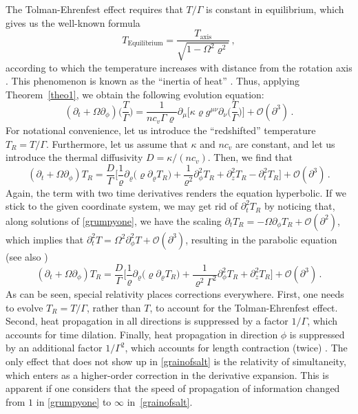\documentclass[a4paper, amsfonts, amssymb, amsmath, reprint, showkeys, nofootinbib, twoside, onecolumn,notitlepage]{revtex4-1}
\theoremstyle{definition}
\theoremstyle{theorem}
\begin{document}
The Tolman-Ehrenfest effect requires that $T/\Gamma$ is constant in equilibrium, which gives us the well-known formula
\begin{equation}\label{Tolmaniamo}
T_{\text{Equilibrium}} =\dfrac{T_{\text{axis}}}{\sqrt{1-\Omega^2\varrho^2}} \, ,
\end{equation}
according to which the temperature increases with distance from the rotation axis \cite[\S 12.5.a]{cercignani_book}.
This phenomenon is known as the ``inertia of heat'' \cite{Israel1981}.
Thus, applying Theorem~\ref{theo1}, we obtain the following evolution equation:
\begin{equation}
(\partial_t{+}\Omega\partial_\phi)\bigg( \dfrac{T}{\Gamma} \bigg)=\dfrac{1}{nc_v\Gamma \varrho} \partial_\mu \bigg[\kappa \varrho g^{\mu \nu}\partial_\nu \bigg(\dfrac{T}{\Gamma} \bigg) \bigg] +\mathcal{O}(\partial^3) \, .
\end{equation}
For notational convenience, let us introduce the ``redshifted'' temperature
$T_R=T/\Gamma$. Furthermore, let us assume that $\kappa$ and $nc_v$ are constant, and let us introduce the thermal diffusivity $D=\kappa/(nc_v)$. Then, we find that
\begin{equation}\label{grumpyone}
(\partial_t{+}\Omega\partial_\phi)T_R=\dfrac{D}{\Gamma } \bigg[ \dfrac{1}{\varrho} \partial_\varrho \big( \varrho \partial_\varrho T_R\big)+\dfrac{1}{\varrho^2}  \partial_\phi^2 T_R+ \partial_z^2 T_R- \partial_t^2 T_R\bigg] +\mathcal{O}(\partial^3)\, .
\end{equation}
Again, the term with two time derivatives renders the equation hyperbolic. If we stick to the given coordinate system, we may get rid of $\partial_t^2 T_R$ by noticing that, along solutions of \eqref{grumpyone}, we have the scaling $\partial_t T_R=-\Omega \partial_\phi T_R +\mathcal{O}(\partial^2)$, which implies that $\partial_t^2 T=\Omega^2 \partial^2_\phi T+\mathcal{O}(\partial^3)$, resulting in the parabolic equation (see also \cite{Basar:2024qxd,GavassinoParabolic2025hwz})
\begin{equation}\label{grainofsalt}
(\partial_t{+}\Omega\partial_\phi)T_R=\dfrac{D}{\Gamma } \bigg[ \dfrac{1}{\varrho} \partial_\varrho \big( \varrho \partial_\varrho T_R\big)+\dfrac{1 }{\varrho^2\Gamma^2}  \partial_\phi^2 T_R+ \partial_z^2 T_R\bigg] +\mathcal{O}(\partial^3) \, .
\end{equation}
As can be seen, special relativity places corrections everywhere. First, one needs to evolve $T_R=T/\Gamma$, rather than $T$, to account for the Tolman-Ehrenfest effect. Second, heat propagation in all directions is suppressed by a factor $1/\Gamma$, which accounts for time dilation. Finally, heat propagation in direction $\phi$ is suppressed by an additional factor $1/\Gamma^2$, which accounts for length contraction (twice) \cite{Basar:2024qxd}. The only effect that does not show up in \eqref{grainofsalt} is the relativity of simultaneity, which enters as a higher-order correction in the derivative expansion. This is apparent if one considers that the speed of propagation of information changed from $1$ in \eqref{grumpyone} to $\infty$ in~\eqref{grainofsalt}.
\end{document}
